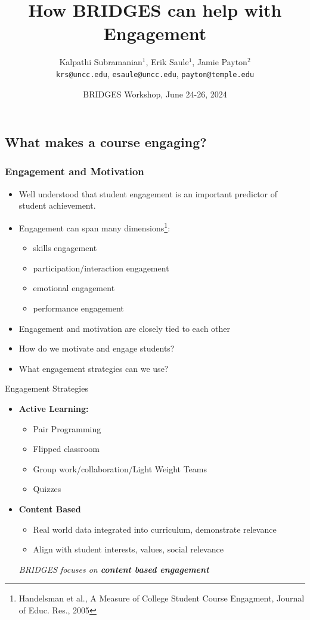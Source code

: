 \documentclass[aspectratio=169]{beamer}
\title{How BRIDGES can help with Engagement}
\subtitle{}
\author{Kalpathi Subramanian$^1$, Erik Saule$^1$, Jamie Payton$^2$\\\texttt{krs@uncc.edu}, \texttt{esaule@uncc.edu}, \texttt{payton@temple.edu} }
\institute{$^1$The University of North Carolina at Charlotte\\$^2$Temple University}
\date{BRIDGES Workshop, June 24-26, 2024}
\begin{document}
\begin{frame}
\titlepage
\end{frame}




\subsection{What makes a course engaging?}

\begin{frame}
	\frametitle{Engagement and Motivation}
\begin{itemize} 
	\item Well understood that student engagement is an important
		predictor of student achievement.
	\item Engagement can span many dimensions\footnote{Handelsman et al., 
	A Measure of College Student Course Engagment, Journal of Educ. Res., 2005}: 
		\begin{itemize}
			\item skills engagement
			\item participation/interaction engagement
			\item emotional engagement
			\item performance engagement
		\end{itemize}
	\item Engagement and motivation are closely tied to each other
	\item How do we motivate and engage students? 
	\item What engagement  strategies  can we use? 
\end{itemize}
\end{frame}
\begin{frame}{Engagement Strategies}
\begin{itemize}
	\item \textbf{Active Learning:}
	\begin{itemize}
		\item Pair Programming
		\item Flipped classroom
		\item Group work/collaboration/Light Weight Teams
		\item Quizzes
	\end{itemize}
	\item \textbf{Content Based}
	\begin{itemize}
		\item Real world data integrated into  curriculum, demonstrate
			relevance
		\item Align with student interests, values, social relevance
	\end{itemize}
\vspace*{0.2in}
\textsl{\large BRIDGES focuses on \textbf{content based engagement}}
\end{itemize}
\end{frame}
\end{document}
